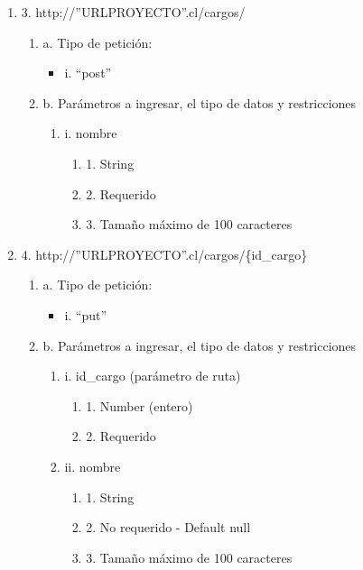 \begin{enumerate}
    \item 3. http://”URLPROYECTO”.cl/cargos/
    \begin{enumerate}
        \item a. Tipo de petición:
            \begin{itemize}
               \item i. “post”
            \end{itemize}
        \item b. Parámetros a ingresar, el tipo de datos y restricciones
            \begin{enumerate}
                \item i. nombre
                    \begin{enumerate}
                        \item 1. String
                        \item 2. Requerido
                        \item 3. Tamaño máximo de 100 caracteres
                    \end{enumerate}
            \end{enumerate}
    \end{enumerate}

    \item 4. http://”URLPROYECTO”.cl/cargos/\{id\_cargo\}
    \begin{enumerate}
        \item a. Tipo de petición:
            \begin{itemize}
               \item i. “put”
            \end{itemize}
        \item b. Parámetros a ingresar, el tipo de datos y restricciones
            \begin{enumerate}
                \item i. id\_cargo (parámetro de ruta)
                    \begin{enumerate}
                        \item 1. Number (entero)
                        \item 2. Requerido
                    \end{enumerate}
                \item ii. nombre
                    \begin{enumerate}
                        \item 1. String
                        \item 2. No requerido - Default null
                        \item 3. Tamaño máximo de 100 caracteres
                    \end{enumerate}
            \end{enumerate}
    \end{enumerate}


\end{enumerate}
